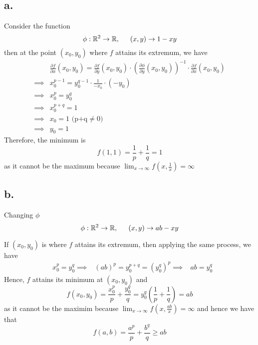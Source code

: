 \documentclass[11pt]{article}
\begin{document}
\subsection*{a.}
Consider the function
\[
    \phi: \mathbb{R}^2 \to \mathbb{R}, \indent (x,y) \to 1-xy    
\]
then at the point $(x_0, y_0)$ where $f$ attains its extremum, we have
\begin{equation*}
    \begin{aligned}
        &\frac{\partial f}{\partial x}(x_0,y_0) = \frac{\partial f}{\partial y} (x_0,y_0) \cdot \left( \frac{\partial \phi}{\partial y}(x_0,y_0) \right)^{-1} \cdot \frac{\partial f}{ \partial x} (x_0,y_0) \\  
        \implies & x_0^{p-1} = y_0^{q-1} \cdot \frac{1}{-x_0} \cdot (-y_0) \\ 
        \implies & x_0^p = y_0^q \\
        \implies & x_0^{p+q} = 1 \\
        \implies & x_0 = 1 \text{ (p+q} \ne 0) \\
        \implies & y_0 = 1
    \end{aligned}
\end{equation*}
Therefore, the minimum is 
\[
    f(1,1) = \frac{1}{p}+ \frac{1}{q} = 1
\]
as it cannot be the maximum because $\lim_{x \to \infty} f(x,\frac{1}{x}) = \infty $
\subsection*{b.}
Changing $\phi$ 
\[
    \phi: \mathbb{R}^2 \to \mathbb{R}, \indent (x,y) \to ab-xy    
\]

If $(x_0,y_0)$ is where $f$ attains its extremum, then applying the same process, we have
\begin{equation*}
    \begin{aligned}
        &x_0^p = y_0^q
        \implies & (ab)^p = y_0^{p+q} = (y_0^q)^p
        \implies & ab = y_0^q
    \end{aligned}
\end{equation*}
Hence, $f$ attains its minimum at $(x_0,y_0)$ and 
\[
    f(x_0,y_0) =  \frac{x_0^p}{p} + \frac{y_0^q}{q} = y_0^q\left(\frac{1}{p} + \frac{1}{q}\right) = ab
\]
as it cannot be the maximim because $\lim_{x \to \infty} f(x,\frac{ab}{x}) = \infty $
and hence we have that 
\[
    f(a,b) = \frac{a^p}{p}+\frac{b^q}{q} \ge ab    
\]
\end{document}
